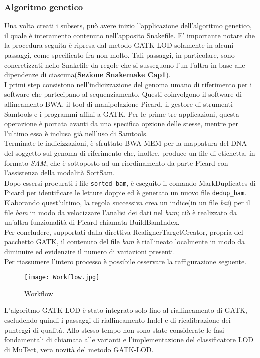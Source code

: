 \subsubsection{Algoritmo genetico}
Una volta creati i subsets, può avere inizio l'applicazione dell'algoritmo genetico, il quale è interamento contenuto nell'apposito Snakefile. E' importante notare che la procedura seguita è ripresa dal metodo GATK-LOD solamente in alcuni passaggi, come specificato fra non molto. Tali passaggi, in particolare, sono concretizzati nello Snakefile da regole che si susseguono l'un l'altra in base alle dipendenze di ciascuna(\textbf{Sezione Snakemake Cap1}).\\
I primi step consistono nell'indicizzazione del genoma umano di riferimento per i software che partecipano al sequenziamento. Questi coinvolgono il software di allineamento BWA, il tool di manipolazione Picard, il gestore di strumenti Samtools e i programmi affini a GATK.  Per le prime tre  applicazioni, questa operazione è portata avanti da una specifica opzione delle stesse, mentre per l'ultimo essa è inclusa già nell'uso di Samtools.\\
Terminate le indicizzazioni, è sfruttato BWA MEM per la mappatura del DNA del soggetto sul genoma di riferimento che, inoltre, produce un file di etichetta, in formato \textit{SAM}, che è sottoposto ad un riordinamento da parte Picard con l'assistenza della modalità SortSam.\\
Dopo essersi procurati i file \verb!sorted_bam!, è eseguito il comando MarkDuplicates di Picard per identificare le letture doppie ed è generato un nuovo file \verb!dedup_bam!. Elaborando quest'ultimo, la regola successiva crea un indice(in un file \textit{bai}) per il file \textit{bam} in modo da velocizzare l'analisi dei dati nel \textit{bam}; ciò è realizzato da un'altra funzionalità di Picard chiamata BuildBamIndex.\\
Per concludere, supportati dalla direttiva RealignerTargetCreator, propria del pacchetto GATK, il contenuto del file \textit{bam} è riallineato localmente in modo da diminuire ed evidenzire il numero di variazioni presenti.\\
Per riassumere l'intero processo è possibile osservare la raffigurazione seguente.
\begin{figure}[H]
\centering
\texttt{[image: Workflow.jpg]}
\caption{Workflow}
\label{fig:workflow}
\end{figure}
L'algoritmo GATK-LOD è stato integrato solo fino al riallineamento di GATK, escludendo quindi i passaggi di riallineamento Indel e di ricalibrazione dei punteggi di qualità. Allo stesso tempo non sono state considerate le fasi fondamentali di chiamata alle varianti e l'implementazione del classificatore LOD di MuTect, vera novità del metodo GATK-LOD.\\
